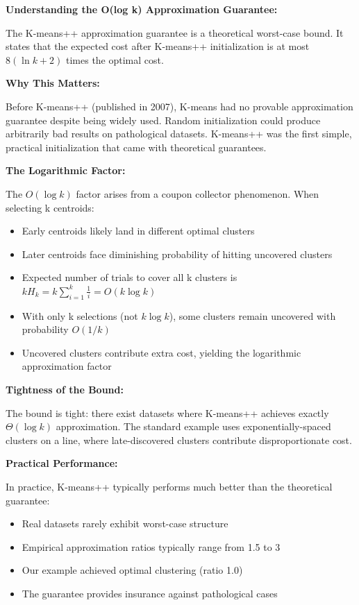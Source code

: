 \documentclass[12pt]{article}
\begin{document}
\begin{explanation}
\textbf{Understanding the O(log k) Approximation Guarantee:}

The K-means++ approximation guarantee is a theoretical worst-case bound. It states that the expected cost after K-means++ initialization is at most $8(\ln k + 2)$ times the optimal cost.

\textbf{Why This Matters:}

Before K-means++ (published in 2007), K-means had no provable approximation guarantee despite being widely used. Random initialization could produce arbitrarily bad results on pathological datasets. K-means++ was the first simple, practical initialization that came with theoretical guarantees.

\textbf{The Logarithmic Factor:}

The $O(\log k)$ factor arises from a coupon collector phenomenon. When selecting k centroids:
\begin{itemize}
    \item Early centroids likely land in different optimal clusters
    \item Later centroids face diminishing probability of hitting uncovered clusters
    \item Expected number of trials to cover all k clusters is $k H_k = k \sum_{i=1}^k \frac{1}{i} = O(k \log k)$
    \item With only k selections (not $k \log k$), some clusters remain uncovered with probability $O(1/k)$
    \item Uncovered clusters contribute extra cost, yielding the logarithmic approximation factor
\end{itemize}

\textbf{Tightness of the Bound:}

The bound is tight: there exist datasets where K-means++ achieves exactly $\Theta(\log k)$ approximation. The standard example uses exponentially-spaced clusters on a line, where late-discovered clusters contribute disproportionate cost.

\textbf{Practical Performance:}

In practice, K-means++ typically performs much better than the theoretical guarantee:
\begin{itemize}
    \item Real datasets rarely exhibit worst-case structure
    \item Empirical approximation ratios typically range from 1.5 to 3
    \item Our example achieved optimal clustering (ratio 1.0)
    \item The guarantee provides insurance against pathological cases
\end{itemize}


\end{explanation}
\end{document}
